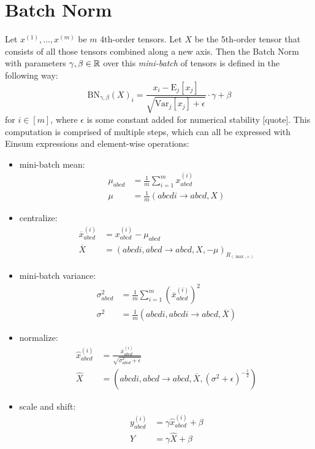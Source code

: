 \section{Batch Norm}
Let $x^{(1)},\dots,x^{(m)}$ be $m$ 4th-order tensors.
Let $X$ be the 5th-order tensor that consists of all those tensors combined along a new axis.
Then the Batch Norm with parameters $\gamma,\beta \in \mathbb{R}$ over this \textit{mini-batch} of tensors is defined in the following way:
$$\text{BN}_{\gamma,\beta}(X)_i = \frac{x_i - \text{E}_j[x_j]}{\sqrt{\text{Var}_j[x_j] + \epsilon}} \cdot \gamma + \beta$$
for $i \in [m]$, where $\epsilon$ is some constant added for numerical stability [quote].
This computation is comprised of multiple steps, which can all be expressed with Einsum expressions and element-wise operations:
\begin{itemize}
    \item mini-batch mean:
          \begin{align*}
              \mu_{abcd} & = \frac{1}{m} \sum\limits_{i = 1}^{m} x^{(i)}_{abcd} \\
              \mu        & = \frac{1}{m} (abcdi \rightarrow abcd, X)
          \end{align*}
    \item centralize:
          \begin{align*}
              \overline{x}^{(i)}_{abcd} & = x^{(i)}_{abcd} - \mu_{abcd}                            \\
              \overline{X}              & = (abcdi, abcd \rightarrow abcd, X, -\mu)_{R_{(\max,+)}}
          \end{align*}
    \item mini-batch variance:
          \begin{align*}
              \sigma^2_{abcd} & = \frac{1}{m} \sum\limits_{i = 1}^{m} \left(\overline{x}^{(i)}_{abcd}\right)^2 \\
              \sigma^2        & = \frac{1}{m} (abcdi,abcdi \rightarrow abcd, \overline{X})
          \end{align*}
    \item normalize:
          \begin{align*}
              \hat{x}^{(i)}_{abcd} & = \frac{\overline{x}^{(i)}_{abcd}}{\sqrt{\sigma^2_{abcd} + \epsilon}}                \\
              \hat{X}              & = (abcdi, abcd \rightarrow abcd, \overline{X}, (\sigma^2 + \epsilon)^{-\frac{1}{2}})
          \end{align*}
    \item scale and shift:
          \begin{align*}
              y^{(i)}_{abcd} & = \gamma \hat{x}^{(i)}_{abcd} + \beta \\
              Y              & = \gamma \hat{X} + \beta
          \end{align*}
\end{itemize}

